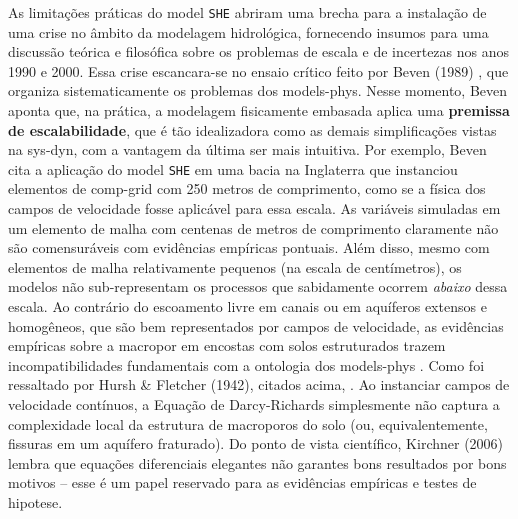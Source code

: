 \documentclass[./main.tex]{subfiles}
\begin{document}
\par As limitações práticas do \gls{model} \texttt{SHE} abriram uma brecha para a instalação de uma crise no âmbito da modelagem hidrológica, fornecendo insumos para uma discussão teórica e filosófica sobre os problemas de escala e de incertezas nos anos 1990 e 2000. Essa crise escancara-se no ensaio crítico feito por Beven (1989) \cite{Beven1989a}, que organiza sistematicamente os problemas dos \gls{models-phys}. Nesse momento, Beven aponta que, na prática, a modelagem fisicamente embasada aplica uma \textbf{premissa de escalabilidade}, que é tão idealizadora como as demais simplificações vistas na \gls{sys-dyn}, com a vantagem da última ser mais intuitiva. Por exemplo, Beven cita a aplicação do \gls{model} \texttt{SHE} em uma bacia na Inglaterra que instanciou elementos de \gls{comp-grid} com 250 metros de comprimento, como se a física dos campos de velocidade fosse aplicável para essa escala. As variáveis simuladas em um elemento de malha com centenas de metros de comprimento claramente não são comensuráveis com evidências empíricas pontuais. Além disso, mesmo com elementos de malha relativamente pequenos (na escala de centímetros), os modelos não sub-representam os processos que sabidamente ocorrem \textit{abaixo} dessa escala. Ao contrário do escoamento livre em canais ou em aquíferos extensos e homogêneos, que são bem representados por campos de velocidade, as evidências empíricas sobre a \gls{macropor} em encostas com solos estruturados trazem incompatibilidades fundamentais com a ontologia dos \gls{models-phys} \cite{Beven2013a, Beven2019a}. Como foi ressaltado por Hursh \& Fletcher (1942), citados acima, . Ao instanciar campos de velocidade contínuos, a Equação de Darcy-Richards simplesmente não captura a complexidade local da estrutura de macroporos do solo (ou, equivalentemente, fissuras em um aquífero fraturado). Do ponto de vista científico, Kirchner (2006) \cite{Kirchner2006a} lembra que equações diferenciais elegantes não garantes bons resultados por bons motivos -- esse é um papel reservado para as evidências empíricas e testes de \gls{hipotese}.
\end{document}
